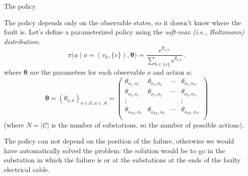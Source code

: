 \documentclass[10pt, aspectratio=169, compress, protectframetitle, handout]{beamer}
\begin{document}
\begin{frame}{The policy}

    The \alert{policy} depends only on the observable states, so it doesn't know where the fault is. Let's define a parameterized policy using the \emph{soft-max (i.e., Boltzmann) distribution}:
    \begin{equation}
        \pi \Big( a \;\big|\; o=(v_k, \{v\}), \boldsymbol \theta \Big) = \frac{e^{\theta_{o,a} }}{\sum_{b \in \{v\}} e^{\theta_{o,b} }} \,.
        \label{eq:parameterizedpolicy}
    \end{equation}
    where $\boldsymbol \theta$ are the parameters for each observable $o$ and action $a$:
    \begin{equation}
        \boldsymbol \theta = (\theta_{o,a})_{o \in \mathcal O, a \in \mathcal A} = \begin{pmatrix}
        \theta_{o_1, a_1} & \theta_{o_1, a_2} & \cdots & \theta_{o_1, a_N} \\
        \theta_{o_2, a_1} & \theta_{o_2, a_2} & \cdots & \theta_{o_2, a_N} \\
        \vdots            &                   &        & \vdots            \\
        \theta_{o_{|O|}, a_1} & \theta_{o_{|O|}, a_2}  & \cdots &  \theta_{o_{|O|}, a_N} \\
        \end{pmatrix}
    \end{equation}
    (where $N = |\mathcal C|$ is the number of substations, so the number of possible actions).
    
    The policy can not depend on the position of the failure, otherwise we would have automatically solved the problem: the solution would be to go in the substation in which the failure is or at the substations at the ends of the faulty electrical cable.
    
\end{frame}
\end{document}
